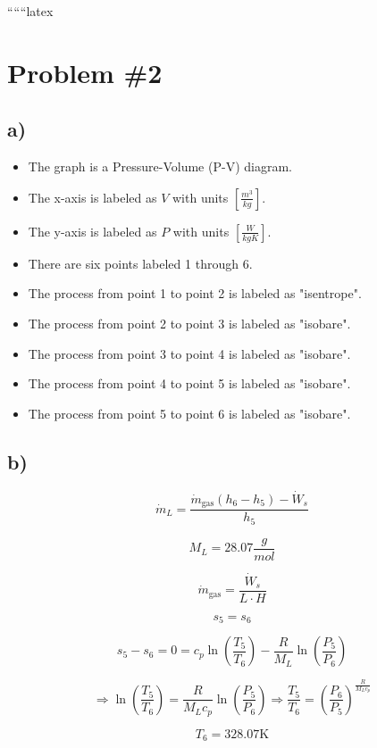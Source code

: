
``````latex


\section*{Problem \#2}

\subsection*{a)}

\begin{itemize}
    \item The graph is a Pressure-Volume (P-V) diagram.
    \item The x-axis is labeled as $V$ with units $[\frac{m^3}{kg}]$.
    \item The y-axis is labeled as $P$ with units $[\frac{W}{kgK}]$.
    \item There are six points labeled 1 through 6.
    \item The process from point 1 to point 2 is labeled as "isentrope".
    \item The process from point 2 to point 3 is labeled as "isobare".
    \item The process from point 3 to point 4 is labeled as "isobare".
    \item The process from point 4 to point 5 is labeled as "isobare".
    \item The process from point 5 to point 6 is labeled as "isobare".
\end{itemize}

\subsection*{b)}

\[
\dot{m}_L = \frac{\dot{m}_{\text{gas}} (h_6 - h_5) - \dot{W}_s}{h_5}
\]

\[
M_L = 28.07 \frac{g}{mol}
\]

\[
\dot{m}_{\text{gas}} = \frac{\dot{W}_s}{L \cdot H}
\]

\[
s_5 = s_6
\]

\[
s_5 - s_6 = 0 = c_p \ln \left( \frac{T_5}{T_6} \right) - \frac{R}{M_L} \ln \left( \frac{P_5}{P_6} \right)
\]

\[
\Rightarrow \ln \left( \frac{T_5}{T_6} \right) = \frac{R}{M_L c_p} \ln \left( \frac{P_5}{P_6} \right) \Rightarrow \frac{T_5}{T_6} = \left( \frac{P_6}{P_5} \right)^{\frac{R}{M_L c_p}}
\]

\[
T_6 = 328.07 \text{K}
\]

